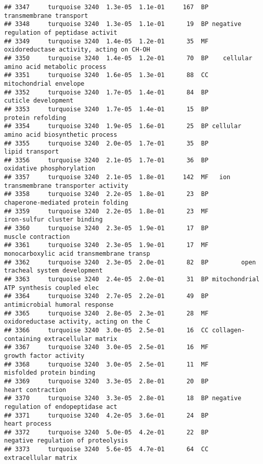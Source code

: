 \documentclass[]{article}
\begin{document}
\begin{verbatim}
## 3347     turquoise 3240  1.3e-05  1.1e-01     167  BP                  transmembrane transport
## 3348     turquoise 3240  1.3e-05  1.1e-01      19  BP negative regulation of peptidase activit
## 3349     turquoise 3240  1.4e-05  1.2e-01      35  MF oxidoreductase activity, acting on CH-OH
## 3350     turquoise 3240  1.4e-05  1.2e-01      70  BP    cellular amino acid metabolic process
## 3351     turquoise 3240  1.6e-05  1.3e-01      88  CC                   mitochondrial envelope
## 3352     turquoise 3240  1.7e-05  1.4e-01      84  BP                      cuticle development
## 3353     turquoise 3240  1.7e-05  1.4e-01      15  BP                        protein refolding
## 3354     turquoise 3240  1.9e-05  1.6e-01      25  BP cellular amino acid biosynthetic process
## 3355     turquoise 3240  2.0e-05  1.7e-01      35  BP                          lipid transport
## 3356     turquoise 3240  2.1e-05  1.7e-01      36  BP                oxidative phosphorylation
## 3357     turquoise 3240  2.1e-05  1.8e-01     142  MF   ion transmembrane transporter activity
## 3358     turquoise 3240  2.2e-05  1.8e-01      23  BP       chaperone-mediated protein folding
## 3359     turquoise 3240  2.2e-05  1.8e-01      23  MF              iron-sulfur cluster binding
## 3360     turquoise 3240  2.3e-05  1.9e-01      17  BP                       muscle contraction
## 3361     turquoise 3240  2.3e-05  1.9e-01      17  MF monocarboxylic acid transmembrane transp
## 3362     turquoise 3240  2.3e-05  2.0e-01      82  BP         open tracheal system development
## 3363     turquoise 3240  2.4e-05  2.0e-01      31  BP mitochondrial ATP synthesis coupled elec
## 3364     turquoise 3240  2.7e-05  2.2e-01      49  BP           antimicrobial humoral response
## 3365     turquoise 3240  2.8e-05  2.3e-01      28  MF oxidoreductase activity, acting on the C
## 3366     turquoise 3240  3.0e-05  2.5e-01      16  CC collagen-containing extracellular matrix
## 3367     turquoise 3240  3.0e-05  2.5e-01      16  MF                   growth factor activity
## 3368     turquoise 3240  3.0e-05  2.5e-01      11  MF                misfolded protein binding
## 3369     turquoise 3240  3.3e-05  2.8e-01      20  BP                        heart contraction
## 3370     turquoise 3240  3.3e-05  2.8e-01      18  BP negative regulation of endopeptidase act
## 3371     turquoise 3240  4.2e-05  3.6e-01      24  BP                            heart process
## 3372     turquoise 3240  5.0e-05  4.2e-01      22  BP       negative regulation of proteolysis
## 3373     turquoise 3240  5.6e-05  4.7e-01      64  CC                     extracellular matrix

\end{verbatim}
\end{document}
